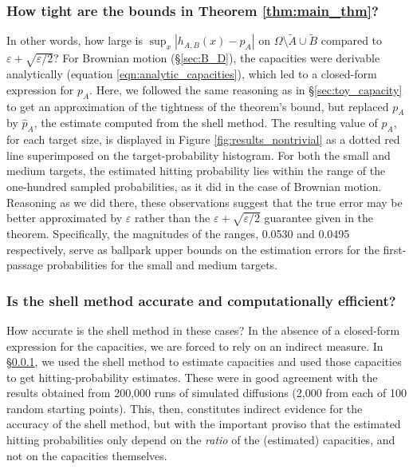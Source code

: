 \documentclass[12pt, nofootinbib,english, amsmath, amssymb, aps, priprint, graphicx,floatfix]{revtex4-1}
\newcommand{\theepsrate}{\varepsilon + \sqrt{\varepsilon/2}}
\theoremstyle{plain}
\theoremstyle{definition}
\theoremstyle{plain}
\newcommand{\tA}{{\tilde A}}
\newcommand{\tB}{{\tilde B}}
\begin{document}
{\subsubsection{How tight are the bounds in Theorem
\ref{thm:main_thm}?}
\label{sec:nontrivial_bounds}
In other words, how large is $\sup_x|h_{A,B}(x)-p_A|$ on $\Omega \setminus \tA \cup \tB$ compared to 
$\theepsrate$?
For Brownian motion (\S\ref{sec:B_D}), 
the capacities were derivable analytically (equation \ref{eqn:analytic_capacities}), which led to 
a closed-form expression for $p_A$. Here,
we followed the same reasoning as in 
\S\ref{sec:toy_capacity}
to get an approximation of the tightness of the theorem's bound, but replaced $p_A$ by  $\hat{p}_A$, the estimate computed from the shell method. The resulting value of $\hat{p}_A$, for each target size, is displayed in 
Figure \ref{fig:results_nontrivial}
as a dotted red line superimposed on the target-probability histogram. For both the small and medium targets, the estimated hitting probability lies within the range of the one-hundred sampled probabilities, as it did in the case of Brownian motion. 
Reasoning as we did there, these observations suggest that the true error may be better approximated by $\varepsilon$ rather than 
the $\theepsrate$
 guarantee given in the theorem. Specifically, the magnitudes of the ranges, 0.0530 and 0.0495 respectively, serve as ballpark upper bounds on the estimation errors for the first-passage probabilities for the small and medium targets.


\subsubsection{Is the shell method accurate and computationally efficient?}
How accurate is the shell method in these cases?  
In the absence of a closed-form expression for the capacities, we are forced to rely on an indirect measure.
In \S\ref{sec:nontrivial_bounds}, we used the shell method to estimate capacities and used those capacities to get hitting-probability estimates. These were in good agreement with
the results obtained from 200,000 runs of simulated diffusions
 (2,000 from each of 100 random starting points).
This, then, constitutes indirect evidence for the accuracy of the shell method, but with the important proviso that the estimated hitting probabilities only depend on the {\em ratio} of the (estimated) capacities, and not on the capacities themselves. 

}
\end{document}
